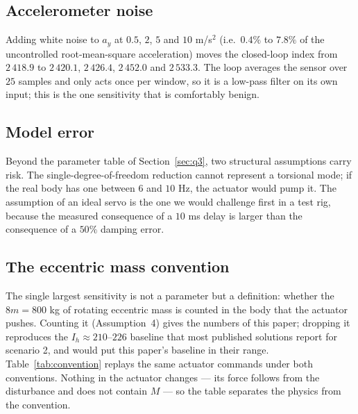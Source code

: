 \documentclass[12pt]{apmcmthesis}
\begin{document}
\subsection{Accelerometer noise}
Adding white noise to $a_y$ at $0.5$, $2$, $5$ and $10$ m/s$^2$ (i.e.\ $0.4\%$ to $7.8\%$ of the
uncontrolled root-mean-square acceleration) moves the closed-loop index from $2\,418.9$ to
$2\,420.1$, $2\,426.4$, $2\,452.0$ and $2\,533.3$. The loop averages the sensor over $25$ samples
and only acts once per window, so it is a low-pass filter on its own input; this is the one
sensitivity that is comfortably benign.

\subsection{Model error}
Beyond the parameter table of Section~\ref{sec:q3}, two structural assumptions carry risk. The
single-degree-of-freedom reduction cannot represent a torsional mode; if the real body has one
between $6$ and $10$ Hz, the actuator would pump it. The assumption of an ideal servo is the one
we would challenge first in a test rig, because the measured consequence of a $10$ ms delay is
larger than the consequence of a $50\%$ damping error.

\subsection{The eccentric mass convention}
\label{sec:convention}
The single largest sensitivity is not a parameter but a definition: whether the $8m=800$ kg of
rotating eccentric mass is counted in the body that the actuator pushes. Counting it (Assumption~4)
gives the numbers of this paper; dropping it reproduces the $I_h\approx210$--$226$ baseline that
most published solutions report for scenario 2, and would put this paper's baseline in their range.
Table~\ref{tab:convention} replays the same actuator commands under both conventions. Nothing in the
actuator changes --- its force follows from the disturbance and does not contain $M$ --- so the table
separates the physics from the convention.
\end{document}
